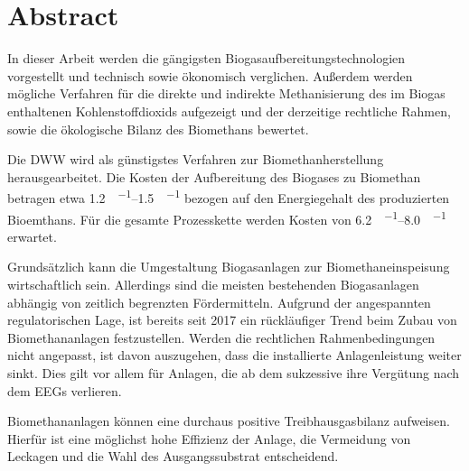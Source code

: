 
\section*{Abstract}

\forceindent In dieser Arbeit werden die gängigsten Biogasaufbereitungstechnologien vorgestellt und technisch sowie ökonomisch verglichen. Außerdem werden mögliche Verfahren für die direkte und indirekte Methanisierung des im Biogas enthaltenen Kohlenstoffdioxids aufgezeigt und der derzeitige rechtliche Rahmen, sowie die ökologische Bilanz des Biomethans bewertet. \smallskip

\forceindent Die \gls{DWW} wird als günstigstes Verfahren zur Biomethanherstellung herausgearbeitet. Die Kosten der Aufbereitung des Biogases zu Biomethan betragen etwa \SIrange{1,2}{1,5}{\ct\per\kwh} bezogen auf den Energiegehalt des produzierten Bioemthans. Für die gesamte Prozesskette werden Kosten von \SIrange{6,2}{8,0}{\ct\per\kwh} erwartet. \smallskip

\forceindent Grundsätzlich kann die Umgestaltung Biogasanlagen zur Biomethaneinspeisung wirtschaftlich sein. Allerdings sind die meisten bestehenden Biogasanlagen abhängig von zeitlich begrenzten Fördermitteln. Aufgrund der angespannten regulatorischen Lage, ist bereits seit \SI{2017}{\relax} ein rückläufiger Trend beim Zubau von Biomethananlagen festzustellen. Werden die rechtlichen Rahmenbedingungen nicht angepasst, ist davon auszugehen, dass die installierte Anlagenleistung weiter sinkt. Dies gilt vor allem für Anlagen, die ab dem  sukzessive ihre Vergütung nach dem \glspl{EEG} verlieren. \smallskip

\forceindent Biomethananlagen können eine durchaus positive Treibhausgasbilanz aufweisen. Hierfür ist eine möglichst hohe Effizienz der Anlage, die Vermeidung von Leckagen und die Wahl des Ausgangssubstrat entscheidend.